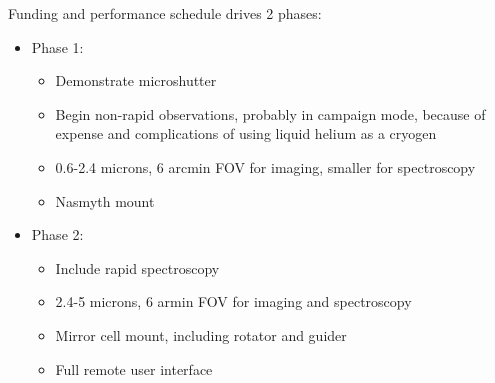 \documentclass{article}
\begin{document}
Funding and performance schedule drives 2 phases:

\begin{itemize}
 \item Phase 1:
   \begin{itemize}
    \item Demonstrate microshutter
    \item Begin non-rapid observations, probably in campaign mode, because
      of expense and complications of using liquid helium as a cryogen
    \item 0.6-2.4 microns, 6 arcmin FOV for imaging, smaller for spectroscopy
    \item Nasmyth mount
   \end{itemize}
 \item Phase 2:
   \begin{itemize}
    \item Include rapid spectroscopy
    \item 2.4-5 microns, 6 armin FOV for imaging and spectroscopy
    \item Mirror cell mount, including rotator and guider
    \item Full remote user interface
   \end{itemize}
  
\end{itemize}
\end{document}
